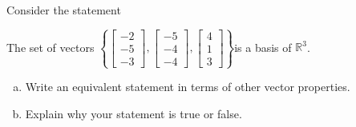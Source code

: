 
\begin{exerciseStatement}


Consider the statement 
\begin{center}\begin{minipage}{0.8\textwidth}
 The set of vectors \( \left\{ \left[\begin{array}{c}
-2 \\
-5 \\
-3
\end{array}\right] , \left[\begin{array}{c}
-5 \\
-4 \\
-4
\end{array}\right] , \left[\begin{array}{c}
4 \\
1 \\
3
\end{array}\right] \right\} \)is a basis of \(\mathbb{R}^3\). 
\end{minipage}\end{center}
    


\begin{enumerate}[(a)]
\item  Write an equivalent statement in terms of other vector properties.
\item  Explain why your statement is true or false.
\end{enumerate}
    
\end{exerciseStatement}
    
